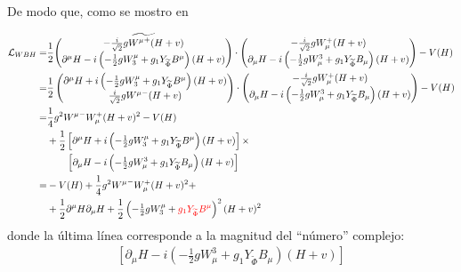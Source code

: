 \begin{frame}
De modo que, como se mostro en 

\begin{align}
  \mathcal{L}_{WBH}=&\frac{1}{2}\widetilde{\begin{pmatrix}
    -\frac{i}{\sqrt{2}}g{W^\mu}^+(H+v)\\
    \partial^\mu H-i\left(-\frac{1}{2}gW_3^\mu+{g_1}Y_{\widetilde{\Phi}} B^\mu\right)(H+v)
  \end{pmatrix}}\cdot
   \begin{pmatrix}
    -\frac{i}{\sqrt{2}}gW_\mu^+(H+v)\\
    \partial_\mu H-i\left(-\frac{1}{2}gW^3_\mu+{g_1}Y_{\widetilde{\Phi}} B_\mu\right)(H+v)
  \end{pmatrix}-V(H)\nonumber\\
=&\frac{1}{2}\begin{pmatrix}
    \partial^\mu H+i\left(-\frac{1}{2}gW_3^\mu+{g_1}Y_{\widetilde{\Phi}} B^\mu\right)(H+v)\\
    \frac{i}{\sqrt{2}}g{W^\mu}^-(H+v)\\
  \end{pmatrix}\cdot
  \begin{pmatrix}
    -\frac{i}{\sqrt{2}}gW_\mu^+(H+v)\\
    \partial_\mu H-i\left(-\frac{1}{2}gW^3_\mu+{g_1}Y_{\widetilde{\Phi}} B_\mu\right)(H+v)
  \end{pmatrix}-V(H)\nonumber\\
  =&\frac{1}{4}g^2{W^\mu}^-W_\mu^+(H+v)^2-V(H)\nonumber\\
  &+\frac{1}{2}\left[\partial^\mu H+i\left(-\tfrac{1}{2}gW_3^\mu+{g_1}Y_{\widetilde{\Phi}} B^\mu\right)(H+v)\right]
  \times\nonumber\\
  &\qquad\left[\partial_\mu H-i\left(-\tfrac{1}{2}gW^3_\mu+{g_1}Y_{\widetilde{\Phi}} B_\mu\right)(H+v)\right]\nonumber\\
 =&-V(H)
  +\frac{1}{4}g^2{W^\mu}^-W_\mu^+(H+v)^2+\nonumber\\
  &+\frac{1}{2}\partial^\mu H\partial_\mu H+\frac{1}{2}\left(-\tfrac{1}{2}gW_3^\mu+{\color{red}{g_1}Y_{\widetilde{\Phi}} B^\mu}\right)^2(H+v)^2
\end{align}
donde la última línea corresponde a la magnitud del ``número'' complejo: 
\begin{align}
\left[\partial_\mu H-i\left(-\tfrac{1}{2}gW^3_\mu+{g_1}Y_{\widetilde{\Phi}} B_\mu\right)(H+v)\right]
\end{align}

\end{frame}

